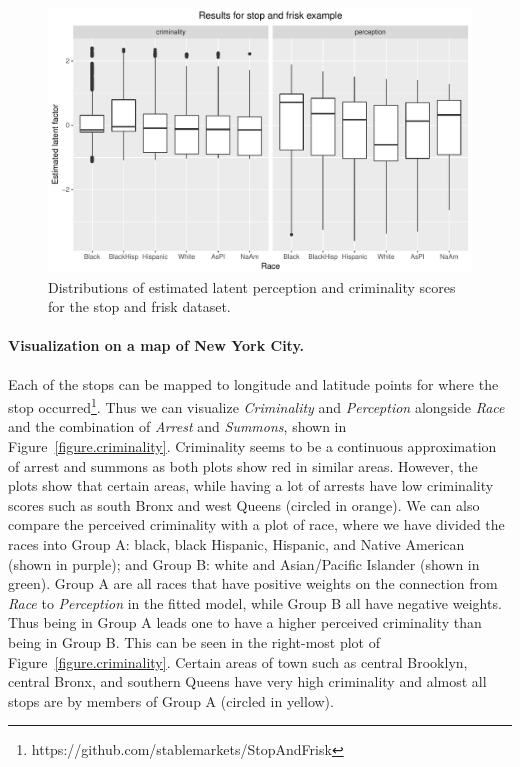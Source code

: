 \begin{figure}[!th]
\begin{center}
\centerline{\includegraphics[width=\columnwidth]{stopandfrisk_output.pdf}}
\vspace{-2ex}
\caption{Distributions of estimated latent perception and criminality scores for the stop and frisk dataset.\label{figure.stop_and_frisk_output}\vspace{-5ex}}
\vspace{-2ex}
\end{center}
\end{figure}

\paragraph{Visualization on a map of New York City.}
Each of the stops can be mapped to longitude and latitude points for where the stop occurred\footnote{https://github.com/stablemarkets/StopAndFrisk}. Thus we can visualize \emph{Criminality} and \emph{Perception} alongside \emph{Race} and the combination of \emph{Arrest} and \emph{Summons}, shown in Figure~\ref{figure.criminality}.  Criminality seems to be a continuous approximation of arrest and summons as both plots show red in similar areas. However, the plots show that certain areas, while having a lot of arrests have low criminality scores such as south Bronx and west Queens (circled in orange). We can also compare the perceived criminality with a plot of race, where we have divided the races into Group A: black, black Hispanic, Hispanic, and Native American (shown in purple); and Group B: white and Asian/Pacific Islander (shown in green). Group A are all races that have positive weights on the connection from \emph{Race} to \emph{Perception} in the fitted model, while Group B all have negative weights. Thus being in Group A leads one to have a higher perceived criminality than being in Group B. This can be seen in the right-most plot of Figure~\ref{figure.criminality}. Certain areas of town such as central Brooklyn, central Bronx, and southern Queens have very high criminality and almost all stops are by members of Group A (circled in yellow).




